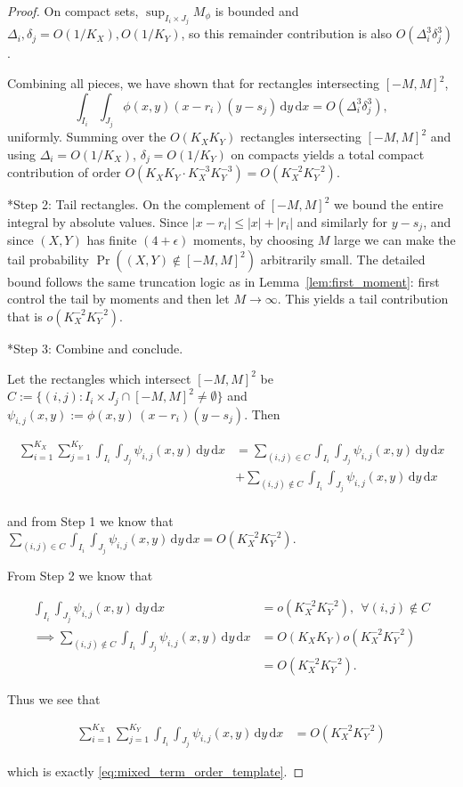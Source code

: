 \documentclass[10pt,a4paper]{amsart}
\newcommand{\abs}[1]{\left\lvert #1 \right\rvert}
\newcommand{\dd}{\,\mathrm{d}}
\providecommand{\paragraph}{}
\begin{document}
\begin{proof}
On compact sets, $\sup_{I_i\times J_j}M_\phi$ is bounded and $\Delta_i,\delta_j=O(1/K_X),O(1/K_Y)$, so this remainder contribution is also $O(\Delta_i^3\delta_j^3)$.

Combining all pieces, we have shown that for rectangles intersecting $[-M,M]^2$,
\[
\int_{I_i}\int_{J_j}\phi(x,y)(x-r_i)(y-s_j)\dd y\dd x = O(\Delta_i^3\delta_j^3),
\]
uniformly. Summing over the $O(K_XK_Y)$ rectangles intersecting $[-M,M]^2$ and using $\Delta_i=O(1/K_X)$, $\delta_j=O(1/K_Y)$ on compacts yields a total compact contribution of order $O(K_XK_Y\cdot K_X^{-3}K_Y^{-3})=O(K_X^{-2}K_Y^{-2})$.

\paragraph*{Step 2: Tail rectangles.}
On the complement of $[-M,M]^2$ we bound the entire integral by absolute values. Since $\abs{x-r_i}\le \abs{x}+\abs{r_i}$ and similarly for $y-s_j$, and since $(X,Y)$ has finite $(4+\epsilon)$ moments, by choosing $M$ large we can make the tail probability $\Pr((X,Y)\notin[-M,M]^2)$ arbitrarily small. The detailed bound follows the same truncation logic as in Lemma~\ref{lem:first_moment}: first control the tail by moments and then let $M\to\infty$. This yields a tail contribution that is $o(K_X^{-2}K_Y^{-2})$.

\paragraph*{Step 3: Combine and conclude.}

Let the rectangles which intersect $[-M,M]^2$ be $C := \{(i,j) : I_i \times J_j \cap [-M,M]^2 \neq \emptyset  \}$ and $\psi_{i,j}(x,y) := \phi(x,y)\,(x-r_i)(y-s_j)$. Then

\begin{align*}
    \sum_{i=1}^{K_X}\sum_{j=1}^{K_Y}\int_{I_i}\int_{J_j}\psi_{i,j}(x,y)
\dd y\dd x &= \sum_{(i,j) \in C} \int_{I_i}\int_{J_j}  
\psi_{i,j}(x,y)\dd y\dd x\\
&+  \sum_{(i,j) \not\in C} \int_{I_i}\int_{J_j} \psi_{i,j}(x,y) \dd y \dd x\\
\end{align*}

and from Step 1 we know that $\sum_{(i,j) \in C} \int_{I_i}\int_{J_j}  
\psi_{i,j}(x,y)\dd y\dd x = O(K_X^{-2} K_Y^{-2})$. 

From Step 2 we know that

\begin{align*}
    \int_{I_i}\int_{J_j} \psi_{i,j}(x,y) \dd y \dd x &= o(K_X^{-2} K_Y^{-2}), ~~ \forall (i,j) \not\in C\\
    \implies \sum_{(i,j) \not\in C} \int_{I_i}\int_{J_j} \psi_{i,j}(x,y) \dd y \dd x &= O(K_X K_Y) o(K_X^{-2} K_Y^{-2})\\
    &= O(K_X^{-2} K_Y^{-2}).
\end{align*}


Thus we see that

\begin{align*}
    \sum_{i=1}^{K_X}\sum_{j=1}^{K_Y}\int_{I_i}\int_{J_j}\psi_{i,j}(x,y)
\dd y\dd x &= O(K_X^{-2} K_Y^{-2})
\end{align*}

which is exactly \eqref{eq:mixed_term_order_template}.
\end{proof}
\end{document}
